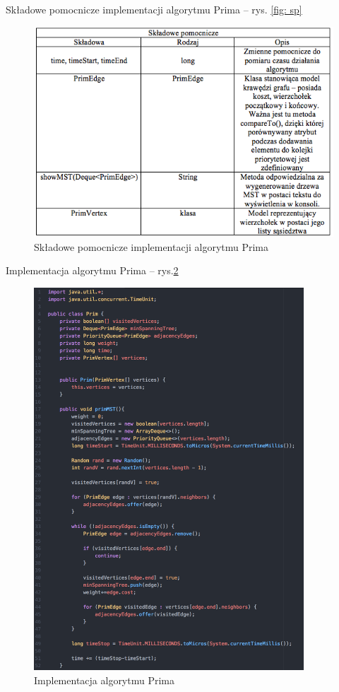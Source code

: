 Składowe pomocnicze implementacji algorytmu Prima -- rys. \ref{fig: sp}
\begin{figure}[htb!]
	\centering
	\includegraphics[width=1\textwidth]{tex/fig/padd}
	\caption{Składowe pomocnicze implementacji algorytmu Prima }
	\label{fig: sp2}
\end{figure}

\newpage
Implementacja algorytmu Prima -- rys.\ref{fig: lp1}
\begin{figure}[htb!]
	\centering
	\includegraphics[width=0.9\textwidth]{tex/fig/lp1}
	\caption{Implementacja algorytmu Prima}
	\label{fig: lp1}
\end{figure}

